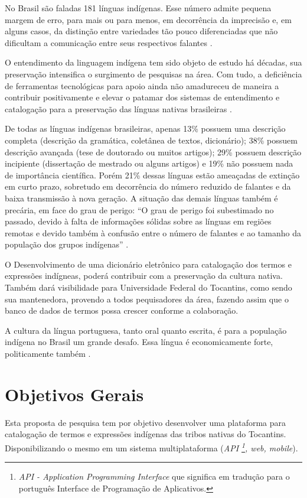 \documentclass[journal]{IEEEtran}
\begin{document}
No Brasil são faladas 181 línguas indígenas. Esse número admite pequena margem de erro, para mais ou para menos, em decorrência da imprecisão e, em alguns casos, da distinção entre variedades tão pouco diferenciadas que não dificultam a comunicação entre seus respectivos falantes \cite{silvaterene2013}.

O entendimento da linguagem indígena tem sido objeto de estudo há décadas, sua preservação intensifica o surgimento de pesquisas na área. Com tudo, a deficiência de ferramentas tecnológicas para apoio ainda não amadureceu de maneira a contribuir positivamente e elevar o patamar dos sistemas de entendimento e catalogação para a preservação das línguas nativas brasileiras \cite{abreu2013dicionario}.

De todas as línguas indígenas brasileiras, apenas 13\% possuem uma descrição completa (descrição da gramática, coletânea de textos, dicionário); 38\% possuem descrição avançada (tese de doutorado ou muitos artigos); 29\% possuem descrição incipiente (dissertação de mestrado ou alguns artigos) e 19\% não possuem nada de importância científica. Porém 21\% dessas línguas estão ameaçadas de extinção em curto prazo, sobretudo em decorrência do número reduzido de falantes e da baixa transmissão à nova geração. A situação das demais línguas também é precária, em face do grau de perigo: “O grau de perigo foi subestimado no passado, devido à falta de informações sólidas sobre as línguas em regiões remotas e devido também à confusão entre o número de falantes e ao tamanho da população dos grupos indígenas” \cite{moore2008}.

O Desenvolvimento de uma dicionário eletrônico para catalogação dos termos e expressões indígneas, poderá contribuir com a preservação da cultura nativa. Também dará visibilidade para Universidade Federal do Tocantins, como sendo sua mantenedora, provendo a todos pequisadores da área, fazendo assim que o banco de dados de termos possa crescer conforme a colaboração.

A cultura da língua portuguesa, tanto oral quanto escrita, é para a população indígena no Brasil um grande desafo. Essa língua é economicamente forte, politicamente também \cite{eduardo2018}.

\section{Objetivos Gerais}

Esta proposta de pesquisa tem por objetivo desenvolver uma plataforma para catalogação de termos e expressões indígenas das tribos nativas do Tocantins. Disponibilizando o mesmo em um sistema multiplataforma ({\it API \footnote{{\it API - Application Programming Interface} que significa em tradução para o português Interface de Programação de Aplicativos.}, web, mobile}).
\end{document}
